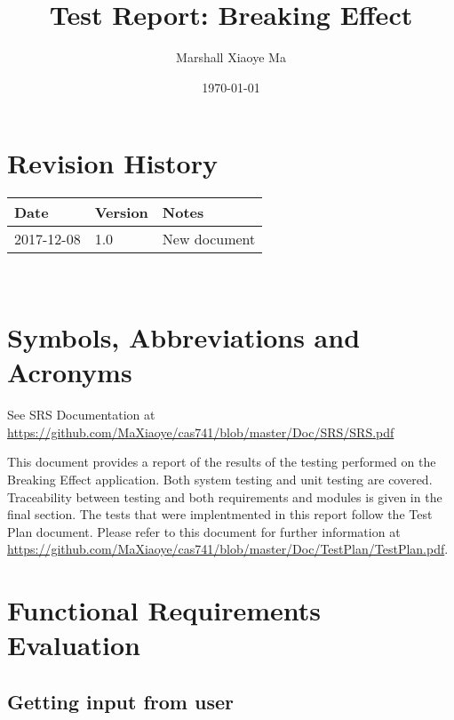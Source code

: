 \documentclass[12pt, titlepage]{article}
\begin{document}
\title{Test Report: Breaking Effect} 
\author{Marshall Xiaoye Ma}
\date{\today}
	
\maketitle


\section{Revision History}

\begin{tabularx}{\textwidth}{p{3cm}p{2cm}X}
\toprule {\bf Date} & {\bf Version} & {\bf Notes}\\
\midrule
2017-12-08 & 1.0 & New document\\
\bottomrule
\end{tabularx}

~\newpage

\section{Symbols, Abbreviations and Acronyms}

See SRS Documentation at \url{https://github.com/MaXiaoye/cas741/blob/master/Doc/SRS/SRS.pdf}

\newpage

\tableofcontents

\listoftables %

\listoffigures %

\newpage


This document provides a report of the results of the testing performed on the Breaking Effect application. Both system testing and unit testing are covered. Traceability between testing and both requirements and modules is given in the final section.
The tests that were implentmented in this report follow the Test Plan document. Please refer to this document for further information at \url{https://github.com/MaXiaoye/cas741/blob/master/Doc/TestPlan/TestPlan.pdf}.

\section{Functional Requirements Evaluation}

\subsection{Getting input from user}
\label{Sec_TestInput}
\end{document}

